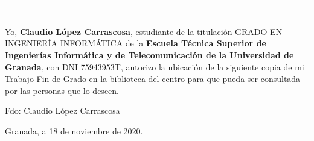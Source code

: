 \section*{}
\noindent\rule[-1ex]{\textwidth}{2pt}\\[4.5ex]

Yo, \textbf{Claudio López Carrascosa}, estudiante de la titulación GRADO EN INGENIERÍA INFORMÁTICA de la \textbf{Escuela Técnica Superior
de Ingenierías Informática y de Telecomunicación de la Universidad de Granada}, con DNI 75943953T, autorizo la
ubicación de la siguiente copia de mi Trabajo Fin de Grado en la biblioteca del centro para que pueda ser
consultada por las personas que lo deseen.

\vspace{6cm}

\noindent Fdo: Claudio López Carrascosa

\vspace{2cm}

\begin{flushright}
Granada, a 18 de noviembre de 2020.
\end{flushright}
